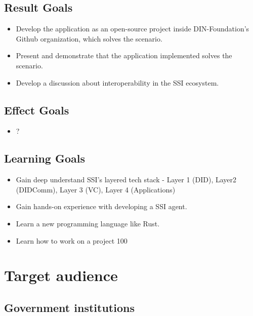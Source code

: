 \subsection{Result Goals}

\begin{itemize}
\item Develop the application as an open-source project inside DIN-Foundation's Github organization, which solves the scenario.
\item Present and demonstrate that the application implemented solves the scenario.
\item Develop a discussion about interoperability in the SSI ecosystem.
\end{itemize}

\subsection{Effect Goals}

\begin{itemize}
\item ?
\end{itemize}

\subsection{Learning Goals}

\begin{itemize}
\item Gain deep understand SSI's layered tech stack - Layer 1 (DID), Layer2 (DIDComm), Layer 3 (VC), Layer 4 (Applications)
\item Gain hands-on experience with developing a SSI agent.
\item Learn a new programming language like Rust.
\item Learn how to work on a project 100%
\end{itemize}





\section{Target audience}

\subsection{Government institutions}


